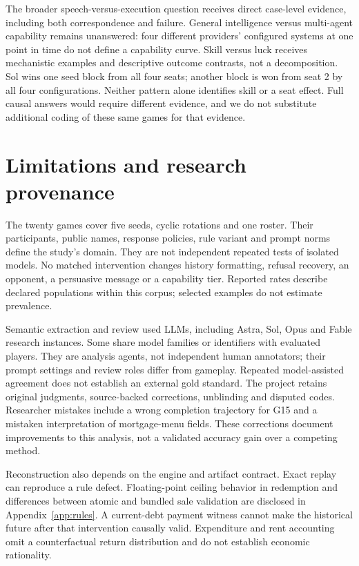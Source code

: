 The broader speech-versus-execution question receives direct case-level evidence, including both correspondence and failure. General intelligence versus multi-agent capability remains unanswered: four different providers' configured systems at one point in time do not define a capability curve. Skill versus luck receives mechanistic examples and descriptive outcome contrasts, not a decomposition. Sol wins one seed block from all four seats; another block is won from seat 2 by all four configurations. Neither pattern alone identifies skill or a seat effect. Full causal answers would require different evidence, and we do not substitute additional coding of these same games for that evidence.

\section{Limitations and research provenance}

The twenty games cover five seeds, cyclic rotations and one roster. Their participants, public names, response policies, rule variant and prompt norms define the study's domain. They are not independent repeated tests of isolated models. No matched intervention changes history formatting, refusal recovery, an opponent, a persuasive message or a capability tier. Reported rates describe declared populations within this corpus; selected examples do not estimate prevalence.

Semantic extraction and review used LLMs, including Astra, Sol, Opus and Fable research instances. Some share model families or identifiers with evaluated players. They are analysis agents, not independent human annotators; their prompt settings and review roles differ from gameplay. Repeated model-assisted agreement does not establish an external gold standard. The project retains original judgments, source-backed corrections, unblinding and disputed codes. Researcher mistakes include a wrong completion trajectory for G15 and a mistaken interpretation of mortgage-menu fields. These corrections document improvements to this analysis, not a validated accuracy gain over a competing method.

Reconstruction also depends on the engine and artifact contract. Exact replay can reproduce a rule defect. Floating-point ceiling behavior in redemption and differences between atomic and bundled sale validation are disclosed in Appendix~\ref{app:rules}. A current-debt payment witness cannot make the historical future after that intervention causally valid. Expenditure and rent accounting omit a counterfactual return distribution and do not establish economic rationality.


